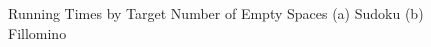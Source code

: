 \begin{figure}
     \centering
     \caption{Running Times by Target Number of Empty Spaces (a) Sudoku (b) Fillomino}
\end{figure}





